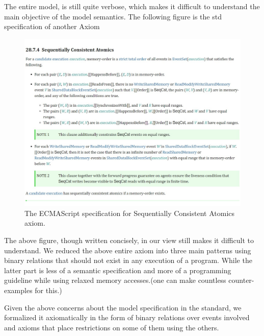     The entire model, is still quite verbose, which makes it difficult to understand the main objective of the model semantics. 
    The following figure is the std specification of another Axiom 
    \begin{figure}[H]
        \centering 
        \includegraphics[scale=0.6]{4.ECMAScriptMemoryModel/ECMAScriptStdSeqCnsAt.pdf}
        \caption{The ECMAScript specification for Sequentially Consistent Atomics axiom.}
    \end{figure}
    The above figure, though written concisely, in our view still makes it difficult to understand. 
    We reduced the above entire axiom into three main patterns using binary relations that should not exist in any execution of a program. 
    While the latter part is less of a semantic specification and more of a programming guideline while using relaxed memory accesses.(one can make countless counter-examples for this.) 

Given the above concerns about the model specification in the standard, we formalized it axiomatically in the form of binary relations over events involved and axioms that place restrictions on some of them using the others. 

